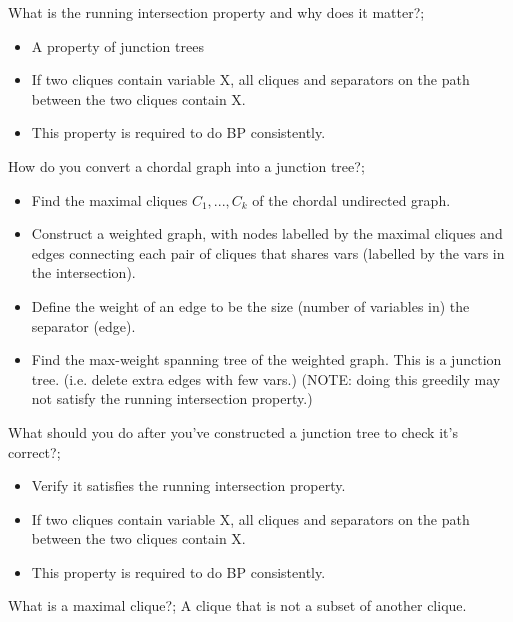 \documentclass{article}
\begin{document}
What is the running intersection property and why does it matter?; \begin{itemize} \item A property of junction trees \item If two cliques contain variable X, all cliques and separators on the path between the two cliques contain X.  \item This property is required to do BP consistently.  \end{itemize}

How do you convert a chordal graph into a junction tree?; \begin{itemize} \item Find the maximal cliques $C_1,...,C_k$ of the chordal undirected graph.  \item Construct a weighted graph, with nodes labelled by the maximal cliques and edges connecting each pair of cliques that shares vars (labelled by the vars in the intersection).  \item Define the weight of an edge to be the size (number of variables in) the separator (edge).  \item Find the max-weight spanning tree of the weighted graph. This is a junction tree. (i.e. delete extra edges with few vars.) (NOTE: doing this greedily may not satisfy the running intersection property.) \end{itemize}

What should you do after you've constructed a junction tree to check it's correct?; \begin{itemize} \item Verify it satisfies the running intersection property.  \item If two cliques contain variable X, all cliques and separators on the path between the two cliques contain X.  \item This property is required to do BP consistently.  \end{itemize}

What is a maximal clique?; A clique that is not a subset of another clique.
\end{document}
